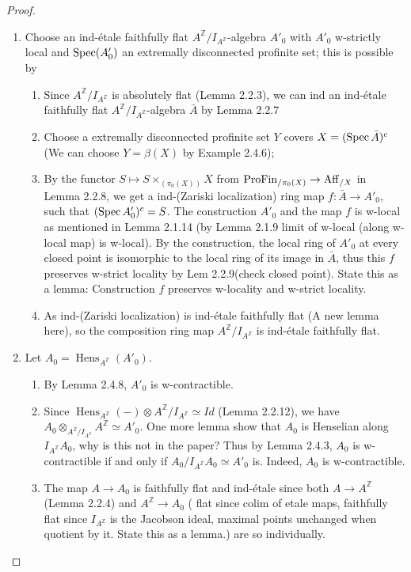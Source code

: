 \begin{proof}
\begin{enumerate}
\item Choose an ind-\'etale faithfully flat $A^{\mathbb{Z}}/I_{A^{\mathbb{Z}}}$-algebra $A'_0$ with $A'_0$ w-strictly local and $\operatorname{Spec}(A'_0)$ an extremally disconnected profinite set; this is possible by
    \begin{enumerate}
    \item Since $A^{\mathbb{Z}}/I_{A^{\mathbb{Z}}}$ is absolutely flat (Lemma 2.2.3), we can ind an ind-\'etale faithfully flat $A^{\mathbb{Z}}/I_{A^{\mathbb{Z}}}$-algebra \(\bar{A}\) by Lemma 2.2.7
    \item Choose a extremally disconnected profinite set $Y$ covers \(X = (\operatorname{Spec} \bar{A})^c\) (We can choose \(Y = \beta(X)\) by Example 2.4.6);
    \item By the functor \(S \mapsto S\times_(\pi_0(X)) X\) from \(\operatorname{ProFin}_{/\pi_0(X)} \to \operatorname{Aff}_{/X}\) in Lemma 2.2.8, we get a ind-(Zariski localization) ring map \(f: \bar{A} \to A'_0 \), such that \((\operatorname{Spec} A'_0)^c = S\). The construction \(A'_0\) and the map \(f\) is w-local as mentioned in Lemma 2.1.14 (by Lemma 2.1.9 limit of w-local (along w-local map) is w-local). By the construction, the local ring of \(A'_0\) at every closed point is isomorphic to the local ring of its image in \(\bar{A}\), thus this \(f\) preserves w-strict locality by Lem 2.2.9(check closed point). {\color{red} State this as a lemma: Construction \(f\) preserves w-locality and w-strict locality.}
    \item As ind-(Zariski localization) is ind-\'etale faithfully flat (A new lemma here), so the composition ring map $A^{\mathbb{Z}}/I_{A^{\mathbb{Z}}}$ is ind-\'etale faithfully flat.
    \end{enumerate}

\item Let $A_0 = \operatorname{Hens}_{A^{\mathbb{Z}}}(A'_0)$. 
    \begin{enumerate}
    \item By Lemma 2.4.8, $A'_0$ is w-contractible.
    \item Since \(\operatorname{Hens}_{A^{\mathbb{Z}}}(-) \otimes A^{\mathbb{Z}}/I_{A^{\mathbb{Z}}} \simeq Id \) (Lemma 2.2.12), we have \(A_0 \otimes_{A^{\mathbb{Z}}/I_{A^{\mathbb{Z}}}} A^{\mathbb{Z}} \simeq A'_0\).
    {\color{red} One more lemma show that \(A_0\) is Henselian along \(I_{A^{\mathbb{Z}}} A_0\), why is this not in the paper?} Thus by Lemma 2.4.3, $A_0$ is w-contractible if and only if $ A_0 / I_{A^{\mathbb{Z}}} A_0 \simeq A'_0 $ is. Indeed, $A_0$ is w-contractible.
    \item The map $A \to A_0$ is faithfully flat and ind-\'etale since both $A \to A^{\mathbb{Z}}$ (Lemma 2.2.4) and $A^{\mathbb{Z}} \to A_0$ ({\color{red} flat since colim of etale maps, faithfully flat since \(I_{A^{\mathbb{Z}}} \) is the Jacobson ideal, maximal points unchanged when quotient by it. State this as a lemma.}) are so individually.
    \end{enumerate}

\end{enumerate}


\end{proof}

